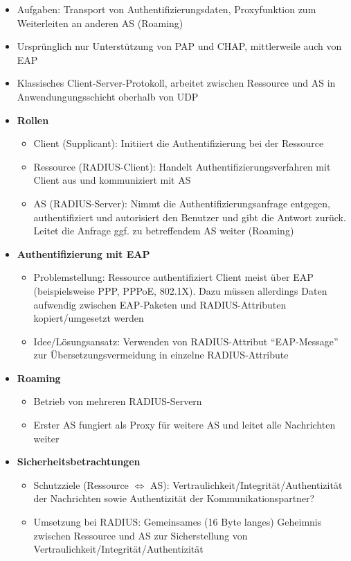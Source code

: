 \begin{itemize}
	\item Aufgaben: Transport von Authentifizierungsdaten, Proxyfunktion zum Weiterleiten an anderen AS (Roaming)
	\item Ursprünglich nur Unterstützung von PAP und CHAP, mittlerweile auch von EAP
	\item Klassisches Client-Server-Protokoll, arbeitet zwischen Ressource und AS in Anwendungungsschicht oberhalb von UDP
	\item \textbf{Rollen}
	\begin{itemize}
		\item Client (Supplicant): Initiiert die Authentifizierung bei der Ressource
		\item Ressource (RADIUS-Client): Handelt Authentifizierungsverfahren mit Client aus und kommuniziert mit AS
		\item AS (RADIUS-Server): Nimmt die Authentifizierungsanfrage entgegen, authentifiziert und autorisiert den Benutzer und gibt die Antwort zurück. Leitet die Anfrage ggf. zu betreffendem AS weiter (Roaming)
	\end{itemize}
	\item \textbf{Authentifizierung mit EAP}
	\begin{itemize}
		\item Problemstellung: Ressource authentifiziert Client meist über EAP (beispielsweise PPP, PPPoE, 802.1X). Dazu müssen allerdings Daten aufwendig zwischen EAP-Paketen und RADIUS-Attributen kopiert/umgesetzt werden
		\item Idee/Lösungsansatz: Verwenden von RADIUS-Attribut "`EAP-Message"' zur Übersetzungsvermeidung in einzelne RADIUS-Attribute
	\end{itemize}
	\item \textbf{Roaming}
	\begin{itemize}
		\item Betrieb von mehreren RADIUS-Servern
		\item Erster AS fungiert als Proxy für weitere AS und leitet alle Nachrichten weiter
	\end{itemize}
	\item \textbf{Sicherheitsbetrachtungen}
	\begin{itemize}
		\item Schutzziele (Ressource \(\Leftrightarrow\) AS): Vertraulichkeit/Integrität/Authentizität der Nachrichten sowie Authentizität der Kommunikationspartner?
		\item Umsetzung bei RADIUS: Gemeinsames (16 Byte langes) Geheimnis zwischen Ressource und AS zur Sicherstellung von Vertraulichkeit/Integrität/Authentizität

\end{itemize}
\end{itemize}
